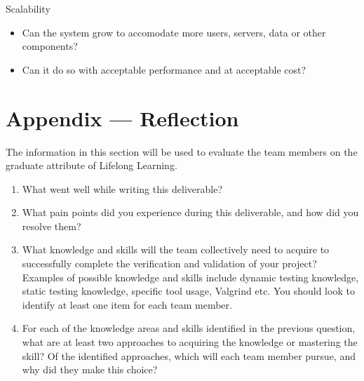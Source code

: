 \documentclass[12pt, titlepage]{article}
\begin{document}
\noindent
Scalability
\begin{itemize}[label=$\square$]
  \item Can the system grow to accomodate more users, servers, data or other components?
  \item Can it do so with acceptable performance and at acceptable cost?
\end{itemize}

\newpage{}
\section*{Appendix --- Reflection}


The information in this section will be used to evaluate the team members on the
graduate attribute of Lifelong Learning.



\begin{enumerate}
  \item What went well while writing this deliverable? 
  \item What pain points did you experience during this deliverable, and how
    did you resolve them?
  \item What knowledge and skills will the team collectively need to acquire to
  successfully complete the verification and validation of your project?
  Examples of possible knowledge and skills include dynamic testing knowledge,
  static testing knowledge, specific tool usage, Valgrind etc.  You should look to
  identify at least one item for each team member.
  \item For each of the knowledge areas and skills identified in the previous
  question, what are at least two approaches to acquiring the knowledge or
  mastering the skill?  Of the identified approaches, which will each team
  member pursue, and why did they make this choice?
\end{enumerate}
\end{document}
